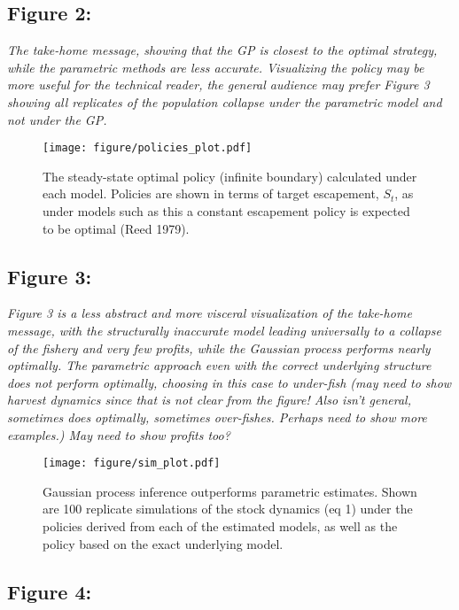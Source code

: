 \documentclass[author-year, review]{elsarticle} %
\makeatletter
\def\maxwidth{\ifdim\Gin@nat@width>\linewidth\linewidth
\else\Gin@nat@width\fi}
\let\Oldincludegraphics\includegraphics
\renewcommand{\includegraphics}[1]{\Oldincludegraphics[width=\maxwidth]{#1}}
\makeatother
\begin{document}
\subsection{Figure 2:}

\emph{The take-home message, showing that the GP is closest to the
optimal strategy, while the parametric methods are less accurate.
Visualizing the policy may be more useful for the technical reader, the
general audience may prefer Figure 3 showing all replicates of the
population collapse under the parametric model and not under the GP.}

\begin{figure}[htbp]
\centering
\texttt{[image: figure/policies\_plot.pdf]}
\caption{The steady-state optimal policy (infinite boundary) calculated
under each model. Policies are shown in terms of target escapement,
$S_t$, as under models such as this a constant escapement policy is
expected to be optimal (Reed 1979).}
\end{figure}

\subsection{Figure 3:}

\emph{Figure 3 is a less abstract and more visceral visualization of the
take-home message, with the structurally inaccurate model leading
universally to a collapse of the fishery and very few profits, while the
Gaussian process performs nearly optimally. The parametric approach even
with the correct underlying structure does not perform optimally,
choosing in this case to under-fish (may need to show harvest dynamics
since that is not clear from the figure! Also isn't general, sometimes
does optimally, sometimes over-fishes. Perhaps need to show more
examples.) May need to show profits too?}

\begin{figure}[htbp]
\centering
\texttt{[image: figure/sim\_plot.pdf]}
\caption{Gaussian process inference outperforms parametric estimates.
Shown are 100 replicate simulations of the stock dynamics (eq 1) under
the policies derived from each of the estimated models, as well as the
policy based on the exact underlying model.}
\end{figure}

\subsection{Figure 4:}
\end{document}
